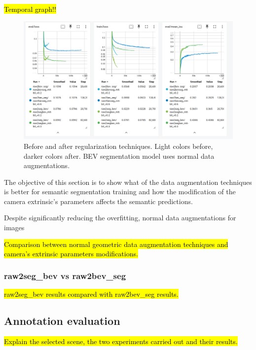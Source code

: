 \hl{Temporal graph!!}
\begin{figure}[h!]
    \centering
    \includegraphics[width=0.7\linewidth]{./images/experiments/before_an_after_data_aug.png}
    \caption{Before and after regularization techniques. Light colors before, darker colors after. BEV segmentation model uses normal data augmentations.}
    \label{fig:before_after_data_aug}
\end{figure}

The objective of this section is to show what of the data augmentation techniques is better for  semantic segmentation training and how the modification of the camera extrinsic's parameters affects the semantic predictions.

Despite significantly reducing the overfitting, normal data augmentations for  images

\hl{Comparison between normal geometric data augmentation techniques and camera's extrinsic parameters modifications.}


\subsubsection{raw2seg\_bev vs raw2bev\_seg}
\hl{raw2seg\_bev results compared with raw2bev\_seg results.}



\subsection{Annotation evaluation}
\hl{Explain the selected scene, the two experiments carried out and their results.}


